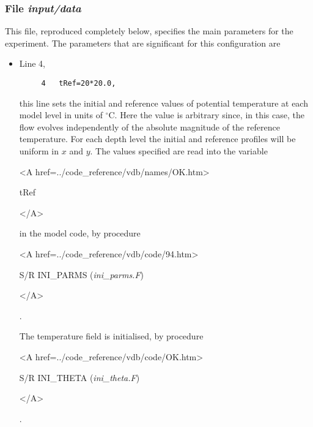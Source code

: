 \subsubsection{File {\it input/data}}

This file, reproduced completely below, specifies the main parameters 
for the experiment. The parameters that are significant for this configuration
are

\begin{itemize}

\item Line 4, 
\begin{verbatim}
     4   tRef=20*20.0,
\end{verbatim}
this line sets
the initial and reference values of potential temperature at each model
level in units of $^{\circ}\mathrm{C}$. Here the value is arbitrary since, in this case, the 
flow evolves independently of the absolute magnitude of the reference temperature.
For each depth level the initial and reference profiles will be uniform in
$x$ and $y$. The values specified are read into the
variable 
{\bf 
\begin{rawhtml} <A href=../code_reference/vdb/names/OK.htm> \end{rawhtml}
tRef
\begin{rawhtml} </A>\end{rawhtml}
} 
in the model code, by procedure 
{\it
\begin{rawhtml} <A href=../code_reference/vdb/code/94.htm> \end{rawhtml}
S/R INI\_PARMS ({\it ini\_parms.F})
\begin{rawhtml} </A>\end{rawhtml}.
}
The temperature field is initialised, by procedure 
{\it
\begin{rawhtml} <A href=../code_reference/vdb/code/OK.htm> \end{rawhtml}
S/R INI\_THETA ({\it ini\_theta.F})
\begin{rawhtml} </A>\end{rawhtml}.
}



\end{itemize}
